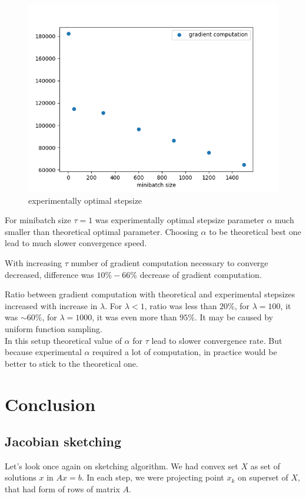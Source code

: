 \documentclass[11pt]{book}
\begin{document}
\begin{figure}[H]
	\centering
	\includegraphics[width=.7\linewidth]{optimal_stepsize.png}
	\caption{experimentally optimal stepsize}
	\label{fig:optimal stepsize}
\end{figure}



For minibatch size $\tau=1$ was experimentally optimal stepsize parameter $\alpha$ much smaller than theoretical optimal parameter. Choosing $\alpha$ to be theoretical best one lead to much slower convergence speed.

With increasing $\tau$ number of gradient computation necessary to converge decreased, difference was $10\% - 66\%$ decrease of gradient computation.

Ratio between gradient computation with theoretical and experimental stepsizes increased with increase in $\lambda$. For $\lambda <1$, ratio was less than $20\%$, for $\lambda=100$, it was $\sim 60\%$, for $\lambda=1000$, it was even more than $95\%$. It may be caused by uniform function sampling.\\

In this setup theoretical value of $\alpha$ for $\tau$ lead to slower convergence rate. But because experimental $\alpha$ required a lot of computation, in practice would be better to stick to the theoretical one.

\chapter{Conclusion}

\section{Jacobian sketching}

Let's look once again on sketching algorithm. We had convex set $X$ as set of solutions $x$ in $Ax=b$. In each step, we were projecting point $x_k$ on superset of $X$, that had form of rows of matrix $A$.
\end{document}
